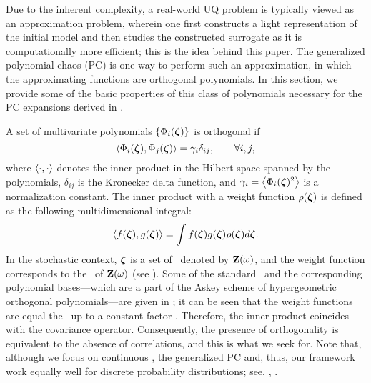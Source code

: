 
Due to the inherent complexity, a real-world UQ problem is typically viewed as an approximation problem, wherein one first constructs a light representation of the initial model and then studies the constructed surrogate as it is computationally more efficient; this is the idea behind this paper. The generalized polynomial chaos (PC) \cite{xiu2002} is one way to perform such an approximation, in which the approximating functions are orthogonal polynomials. In this section, we provide some of the basic properties \cite{xiu2010, maitre2010} of this class of polynomials necessary for the PC expansions derived in .

A set of multivariate polynomials $\{ \Phi_i(\boldsymbol{\zeta}) \}$ is orthogonal if
\begin{equation} \elabel{orthogonality}
  \oInner{\pcb_i(\vz)}{\pcb_j(\vz)} = \pcn_i \delta_{ij}, \qquad \forall i, j,
\end{equation}
where $\oInner{\idot}{\idot}$ denotes the inner product in the Hilbert space spanned by the polynomials, $\delta_{ij}$ is the Kronecker delta function, and $\pcn_i = \oInner{\pcb_i(\vz)^2}$ is a normalization constant. The inner product with a weight function $\rho(\boldsymbol{\zeta})$ is defined as the following multidimensional integral:
\begin{equation} \elabel{inner-product}
  \oInner{f(\vz)}{g(\vz)} = \int f(\vz) g(\vz) \PDF(\vz) d\vz.
\end{equation}
In the stochastic context, $\boldsymbol{\zeta}$ is a set of \rvs\ denoted by $\mathbf{Z}(\omega)$, and the weight function corresponds to the \pdf\ of $\mathbf{Z}(\omega)$ (see ). Some of the standard \pdfs\ and the corresponding polynomial bases---which are a part of the Askey scheme \cite{xiu2002} of hypergeometric orthogonal polynomials---are given in ; it can be seen that the weight functions are equal the \pdfs\ up to a constant factor \cite{durrett2010}. Therefore, the inner product coincides with the covariance operator. Consequently, the presence of orthogonality is equivalent to the absence of correlations, and this is what we seek for. Note that, although we focus on continuous \rvs, the generalized PC and, thus, our framework work equally well for discrete probability distributions; see, \eg, \cite{xiu2010, maitre2010, xiu2002}.

